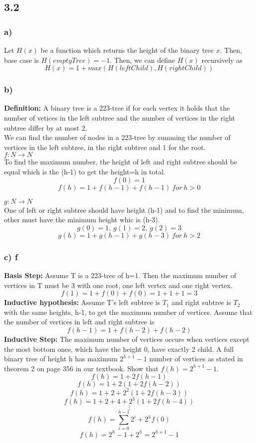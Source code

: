 \documentclass[12pt]{article}
\begin{document}
\subsection*{3.2}
\subsubsection*{a)}
Let $H(x)$ be a function which returns the height of the binary tree $x$. Then, base case is $H(emptyTree)=-1$. Then, we can define $H(x)$ recursively as
$$H(x)=1+max(H(leftChild), H(rightChild))$$
\subsubsection*{b)}
\textbf{Definition:} A binary tree is a 223-tree if for each vertex it holds that the number of vetices in the left subtree and the number of vertices in the right subtree differ by at most 2.\\

We can find the number of nodes in a 223-tree by summing the number of vertices in the left subtree, in the right subtree and 1 for the root. \\

\textbf{$f:N\rightarrow N$}\\
To find the maximum number, the height of left and right subtree should be equal which is the (h-1) to get the height=h in total.
$$f(0)=1$$
$$f(h)=1+f(h-1)+f(h-1)\ for\ h>0$$

\textbf{$g:N\rightarrow N$}\\
One of left or right subtree should have height (h-1) and to find the minimum, other must have the minimum height whic is (h-3).
$$g(0)=1,\ g(1)=2,\ g(2)=3$$
$$g(h)=1+g(h-1)+g(h-3)\ for\ h>2$$

\subsubsection*{c) f}
\textbf{Basis Step:} Assume T is a 223-tree of h=1. Then the maximum number of vertices in T must be 3 with one root, one left vertex and one right vertex.
$$f(1)=1+f(0)+f(0)=1+1+1=3$$
\textbf{Inductive hypothesis:} Assume T's left subtree is $T_1$ and right subtree is $T_2$ with the same heights, h-1, to get the maximum number of vertices. Assume that the number of vertices in left and right subtree is
$$f(h-1)=1+f(h-2)+f(h-2)$$
\textbf{Inductive Step:} The maximum number of vertices occurs when vertices except the most bottom ones, which have the height 0, have exactly 2 child. A full binary tree of height h has maximum $2^{h+1}-1$ number of vertices as stated in theorem 2 on page 356 in our textbook. Show that $f(h)=2^{h+1}-1$.
$$f(h)=1+2f(h-1)$$
$$f(h)=1+2(1+2f(h-2))$$
$$f(h)=1+2+2^2(1+2f(h-3))$$
$$f(h)=1+2+4+2^3(1+2f(h-4))$$
$$\vdots$$
$$f(h)=\sum^{h-1}_{i=0}2^{i}+2^hf(0)$$
$$f(h)=2^h-1+2^h=2^{h+1}-1$$
\end{document}
